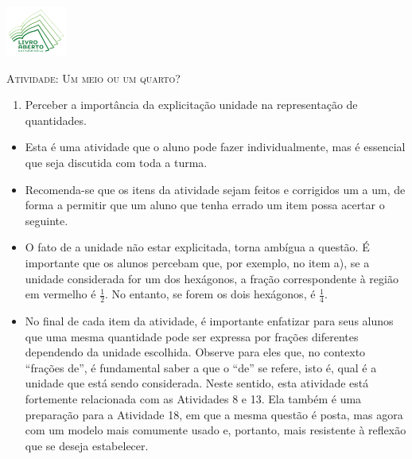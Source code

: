 \documentclass[10 pt,usenames,dvipsnames, oneside]{article}
\begin{document}
\begin{center}
  \begin{minipage}[l]{3cm}
\includegraphics[width=2cm]{logo}    
\end{minipage}\hfill
\begin{minipage}[r]{.8\textwidth}
 {\Large \scshape Atividade: Um meio ou um quarto?}  
\end{minipage}
\end{center}
\vspace{.2cm}

\ifdefined\prof
\begin{goals}
\begin{enumerate}

    \item       Perceber a importância da explicitação unidade na representação de quantidades.

\end{enumerate}
\tcblower

\begin{itemize} %
    \item       Esta é uma atividade que o aluno pode fazer individualmente, mas é essencial que seja discutida com toda a turma.
    \item       Recomenda-se que os itens da atividade sejam feitos e corrigidos um a um, de forma a permitir que um aluno que tenha errado um item possa acertar o seguinte.
    \item       O fato de a unidade não estar explicitada, torna ambígua a questão. É importante que os alunos percebam que, por exemplo, no item a), se a unidade considerada for um dos hexágonos, a fração correspondente à região em vermelho é $\frac{1}{2}$. No entanto, se forem os dois hexágonos, é $\frac{1}{4}$.
    \item       No final de cada item da atividade, é importante enfatizar para seus alunos que uma mesma quantidade pode ser expressa por frações diferentes dependendo da unidade escolhida. Observe para eles que, no contexto       ``frações de'', é fundamental saber a que o       ``de''     se refere, isto é, qual é a unidade que está sendo considerada. Neste sentido, esta atividade está fortemente relacionada com as Atividades 8 e 13. Ela também é uma preparação para a Atividade 18, em que a mesma questão é posta, mas agora com um modelo mais comumente usado e, portanto, mais resistente à reflexão que se deseja estabelecer.
\end{itemize} %

\end{goals}
\end{document}
